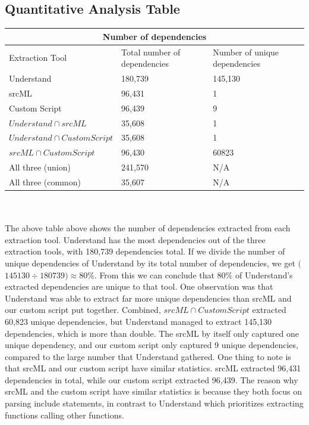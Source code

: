 \documentclass[12pt, dvipsnames, a4paper]{article}
\begin{document}
\subsection{Quantitative Analysis Table}
\begin{tabular}{ |p{6cm}||p{6cm}|p{5cm}|  }
	\hline
	\multicolumn{3}{|c|}{Number of dependencies}                                                    \\
	\hline
	Extraction Tool                  & Total number of dependencies & Number of unique dependencies \\
	\hline
	Understand                       & 180,739                      & 145,130                       \\
	srcML                            & 96,431                       & 1                             \\
	Custom Script                    & 96,439                       & 9                             \\
	$Understand \cap  srcML$         & 35,608                       & 1                             \\
	$Understand \cap  Custom Script$ & 35,608                       & 1                             \\
	$srcML \cap Custom Script$       & 96,430                       & 60823                         \\
	All three (union)                & 241,570                      & N/A                           \\
	All three (common)               & 35,607                       & N/A                           \\
	\hline
\end{tabular}
\newline
\newline
\\
\\
The above table above shows the number of dependencies extracted from each extraction tool. Understand has the most dependencies out of the three extraction tools, with 180,739 dependencies total. If we divide the number of unique dependencies of Understand by its total number of dependencies, we get $($$145130 \div 180739$$) \approx 80\%$. From this we can conclude that 80\% of Understand's extracted dependencies are unique to that tool.
\newline
One observation was that Understand was able to extract far more unique dependencies than srcML and our custom script put together. Combined, $srcML \cap Custom Script$ extracted 60,823 unique dependencies, but Understand managed to extract 145,130 dependencies, which is more than double. The srcML by itself only captured one unique dependency, and our custom script only captured 9 unique dependencies, compared to the large number that Understand gathered.
\newline
One thing to note is that srcML and our custom script have similar statistics. srcML extracted 96,431 dependencies in total, while our custom script extracted 96,439. The reason why srcML and the custom script have similar statistics is because they both focus on parsing include statements, in contrast to Understand which prioritizes extracting functions calling other functions.
\end{document}
